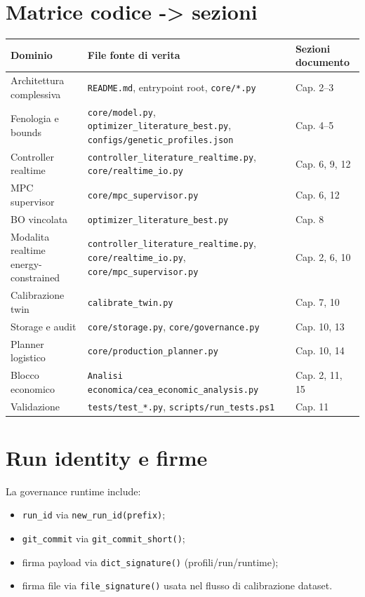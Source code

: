 ﻿\documentclass[11pt,a4paper]{report}
\begin{document}
\section{Matrice codice -> sezioni}
\begin{longtable}{@{}p{3.4cm}p{5.8cm}p{5.2cm}@{}}
\toprule
Dominio & File fonte di verita & Sezioni documento \\ \midrule
Architettura complessiva & \texttt{README.md}, entrypoint root, \texttt{core/*.py} & Cap. 2--3 \\
Fenologia e bounds & \texttt{core/model.py}, \texttt{optimizer\_literature\_best.py}, \texttt{configs/genetic\_profiles.json} & Cap. 4--5 \\
Controller realtime & \texttt{controller\_literature\_realtime.py}, \texttt{core/realtime\_io.py} & Cap. 6, 9, 12 \\
MPC supervisor & \texttt{core/mpc\_supervisor.py} & Cap. 6, 12 \\
BO vincolata & \texttt{optimizer\_literature\_best.py} & Cap. 8 \\
Modalita realtime energy-constrained & \texttt{controller\_literature\_realtime.py}, \texttt{core/realtime\_io.py}, \texttt{core/mpc\_supervisor.py} & Cap. 2, 6, 10 \\
Calibrazione twin & \texttt{calibrate\_twin.py} & Cap. 7, 10 \\
Storage e audit & \texttt{core/storage.py}, \texttt{core/governance.py} & Cap. 10, 13 \\
Planner logistico & \texttt{core/production\_planner.py} & Cap. 10, 14 \\
Blocco economico & \texttt{Analisi economica/cea\_economic\_analysis.py} & Cap. 2, 11, 15 \\
Validazione & \texttt{tests/test\_*.py}, \texttt{scripts/run\_tests.ps1} & Cap. 11 \\
\bottomrule
\end{longtable}

\section{Run identity e firme}
La governance runtime include:
\begin{itemize}
  \item \texttt{run\_id} via \texttt{new\_run\_id(prefix)};
  \item \texttt{git\_commit} via \texttt{git\_commit\_short()};
  \item firma payload via \texttt{dict\_signature()} (profili/run/runtime);
  \item firma file via \texttt{file\_signature()} usata nel flusso di calibrazione dataset.
\end{itemize}
\end{document}
